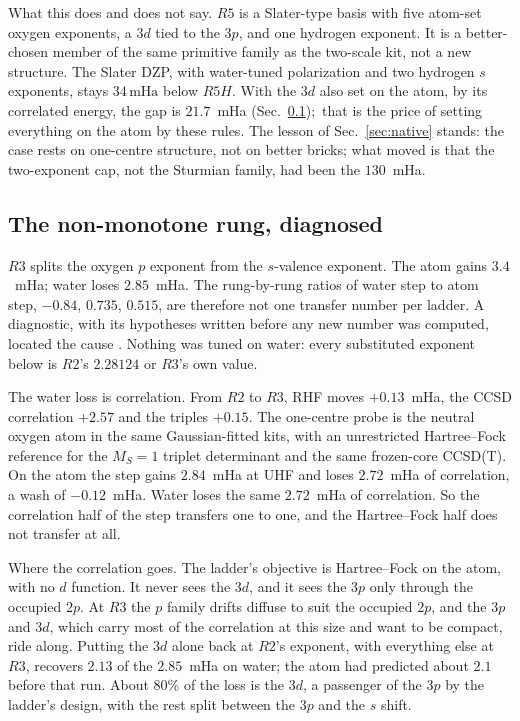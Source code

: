 \documentclass[aps,pra,twocolumn,superscriptaddress,longbibliography]{revtex4-2}
\newcommand{\gvq}[2]{#2}
\newcommand{\mHa}{\,\mathrm{mHa}}
\begin{document}
What this does and does not say.  $R5$ is a Slater-type basis with five
atom-set oxygen exponents, a $3d$ tied to the $3p$, and one hydrogen
exponent.  It is a better-chosen member of the same primitive family as
the two-scale kit, not a new structure.  The Slater DZP, with
water-tuned polarization and two hydrogen $s$ exponents, stays
$\gvq{p62_dzp_below_r5h_mha}{34}\mHa$ below $R5H$.  With the $3d$ also
set on the atom, by its correlated energy, the gap is $21.7$~mHa
(Sec.~\ref{sec:r3});\ that is the price of setting everything on the atom
by these rules.  The lesson of
Sec.~\ref{sec:native} stands: the case rests on one-centre structure,
not on better bricks; what moved is that the two-exponent cap, not the
Sturmian family, had been the $130$~mHa.

\subsection{The non-monotone rung, diagnosed}
\label{sec:r3}

$R3$ splits the oxygen $p$ exponent from the $s$-valence exponent.  The
atom gains $3.4$~mHa; water loses $2.85$~mHa.  The rung-by-rung ratios
of water step to atom step, $-0.84$, $0.735$, $0.515$, are therefore not
one transfer number per ladder.  A diagnostic, with its hypotheses
written before any new number was computed, located the cause
\cite{sl_record}.  Nothing was tuned on water: every substituted exponent
below is $R2$'s $2.28124$ or $R3$'s own value.

The water loss is correlation.  From $R2$ to $R3$, RHF moves $+0.13$~mHa,
the CCSD correlation $+2.57$ and the triples $+0.15$.  The one-centre
probe is the neutral oxygen atom in the same Gaussian-fitted kits, with
an unrestricted Hartree--Fock reference for the $M_S=1$ triplet
determinant and the same frozen-core CCSD(T).  On the atom the step
gains $2.84$~mHa at UHF and loses $2.72$~mHa of correlation, a wash of
$-0.12$~mHa.  Water loses the same $2.72$~mHa of correlation.  So the
correlation half of the step transfers one to one, and the Hartree--Fock
half does not transfer at all.

Where the correlation goes.  The ladder's objective is Hartree--Fock on
the atom, with no $d$ function.  It never sees the $3d$, and it sees the
$3p$ only through the occupied $2p$.  At $R3$ the $p$ family drifts
diffuse to suit the occupied $2p$, and the $3p$ and $3d$, which carry
most of the correlation at this size and want to be compact, ride along.
Putting the $3d$ alone back at $R2$'s exponent, with everything else at
$R3$, recovers $2.13$ of the $2.85$~mHa on water; the atom had predicted
about $2.1$ before that run.  About $80\%$ of the loss is the $3d$, a
passenger of the $3p$ by the ladder's design, with the rest split
between the $3p$ and the $s$ shift.
\end{document}
